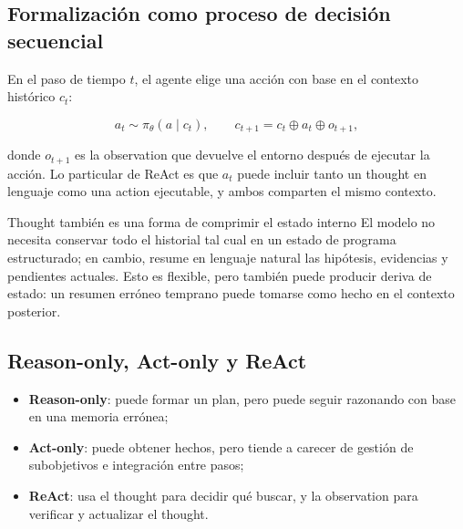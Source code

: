 \documentclass[a4paper]{article}
\begin{document}


\subsection{Formalización como proceso de decisión secuencial}

En el paso de tiempo $t$, el agente elige una acción con base en el contexto histórico $c_t$:

$$
a_t\sim\pi_\theta(a\mid c_t),\qquad
c_{t+1}=c_t\oplus a_t\oplus o_{t+1},
$$

donde $o_{t+1}$ es la observation que devuelve el entorno después de ejecutar la acción. Lo particular de ReAct es que $a_t$ puede incluir tanto un thought en lenguaje como una action ejecutable, y ambos comparten el mismo contexto.


\begin{knowledgebox}{Thought también es una forma de comprimir el estado interno}
El modelo no necesita conservar todo el historial tal cual en un estado de programa estructurado; en cambio, resume en lenguaje natural las hipótesis, evidencias y pendientes actuales. Esto es flexible, pero también puede producir deriva de estado: un resumen erróneo temprano puede tomarse como hecho en el contexto posterior.
\end{knowledgebox}

\subsection{Reason-only, Act-only y ReAct}


\begin{itemize}
    \item \textbf{Reason-only}: puede formar un plan, pero puede seguir razonando con base en una memoria errónea;
    \item \textbf{Act-only}: puede obtener hechos, pero tiende a carecer de gestión de subobjetivos e integración entre pasos;
    \item \textbf{ReAct}: usa el thought para decidir qué buscar, y la observation para verificar y actualizar el thought.
\end{itemize}
\end{document}
